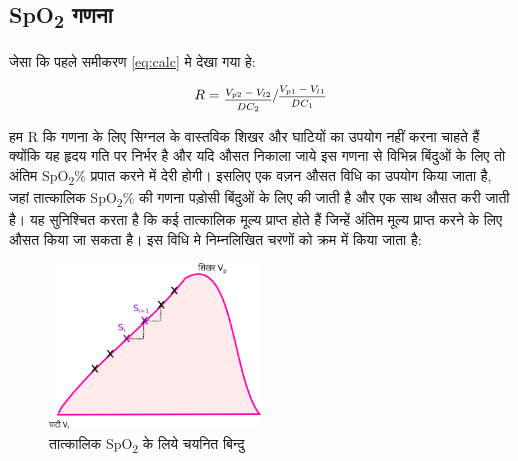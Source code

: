 	\subsection{SpO\textsubscript{2} गणना}
		
		जेसा कि पहले समीकरण \eqref{eq:calc} मे देखा गया हे:
		
		\[
			R = \sfrac{\frac{V_{p2} - V_{l2}}{DC_2}}{\frac{V_{p1} - V_{l1}}{DC_1}}
		\]	
		
		हम R कि गणना के लिए सिग्नल के वास्तविक शिखर और घाटियों का उपयोग नहीं करना चाहते हैं क्योंकि यह हृदय गति पर निर्भर है और यदि औसत निकाला जाये इस गणना से विभिन्न बिंदुओं के लिए तो अंतिम SpO\textsubscript{2}\% प्रपात करने में देरी होगी। इसलिए एक वज़न औसत विधि\cite{wuk} का उपयोग किया जाता है, जहां तात्कालिक SpO\textsubscript{2}\% की गणना पड़ोसी बिंदुओं के लिए की जाती है और एक साथ औसत करी जाती है। यह सुनिश्चित करता है कि कई तात्कालिक मूल्य प्राप्त होते हैं जिन्हें अंतिम मूल्य प्राप्त करने के लिए औसत किया जा सकता है। इस विधि मे निम्नलिखित चरणों को क्रम में किया जाता है:
		
		\begin{figure}[ht!]
			\centering
			\includegraphics[width=0.5\textwidth]{images/spo2_algo.png}
			\caption{तात्कालिक SpO\textsubscript{2} के लिये चयनित बिन्दु}
		\end{figure}
	
